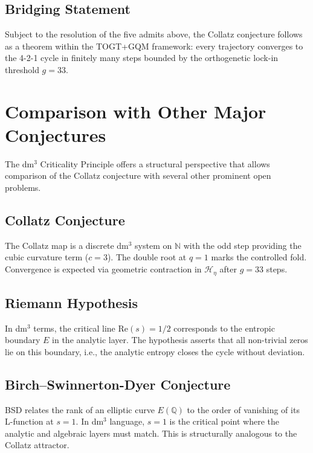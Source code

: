 \documentclass[11pt,a4paper]{article}
\theoremstyle{definition}
\theoremstyle{remark}
\begin{document}
\subsection{Bridging Statement}

Subject to the resolution of the five admits above, the Collatz conjecture follows as a theorem
within the TOGT+GQM framework: every trajectory converges to the 4-2-1 cycle in finitely many
steps bounded by the orthogenetic lock-in threshold $g=33$.

\section{Comparison with Other Major Conjectures}

The dm$^3$ Criticality Principle offers a structural perspective that allows comparison of the
Collatz conjecture with several other prominent open problems.

\subsection{Collatz Conjecture}

The Collatz map is a discrete dm$^3$ system on $\mathbb{N}$ with the odd step providing the
cubic curvature term ($c=3$). The double root at $q=1$ marks the controlled fold. Convergence
is expected via geometric contraction in $\mathcal{H}_\eta$ after $g=33$ steps.

\subsection{Riemann Hypothesis}

In dm$^3$ terms, the critical line $\mathrm{Re}(s)=1/2$ corresponds to the entropic boundary
$E$ in the analytic layer. The hypothesis asserts that all non-trivial zeros lie on this
boundary, i.e., the analytic entropy closes the cycle without deviation.

\subsection{Birch--Swinnerton-Dyer Conjecture}

BSD relates the rank of an elliptic curve $E(\mathbb{Q})$ to the order of vanishing of its
L-function at $s=1$. In dm$^3$ language, $s=1$ is the critical point where the analytic and
algebraic layers must match. This is structurally analogous to the Collatz attractor.
\end{document}

